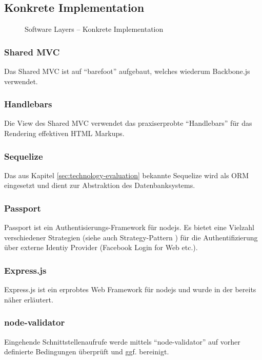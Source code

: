 \subsection*{Konkrete Implementation}

\begin{figure}[H]
	\centering{
		
	}

	\caption{Software Layers -- Konkrete Implementation}
\end{figure}

\subsubsection*{Shared MVC}
Das Shared MVC ist auf ``barefoot'' \cite{Barefoot} aufgebaut, welches wiederum Backbone.js \cite{Backbonejs} verwendet.

\subsubsection*{Handlebars}
Die View des Shared MVC verwendet das praxiserprobte ``Handlebars'' \cite{Handlebars} für das Rendering effektiven HTML Markups.

\subsubsection*{Sequelize}
Das aus Kapitel \ref{sec:technology-evaluation}  bekannte Sequelize \cite{Sequelize} wird als ORM eingesetzt und dient zur Abstraktion des Datenbanksystems.

\subsubsection*{Passport}
Passport \cite{Passportjs} ist ein Authentisierungs-Framework für \gls{nodejs}. Es bietet eine Vielzahl verschiedener Strategien (siehe auch Strategy-Pattern \cite{StrategyPattern}) für die Authentifizierung über externe Identiy Provider (Facebook Login for Web \cite{facebooklogin} etc.).

\subsubsection*{Express.js}
Express.js \cite{Expressjs} ist ein erprobtes Web Framework für \gls{nodejs} und wurde in der  bereits näher erläutert.

\subsubsection*{node-validator}
Eingehende Schnittstellenaufrufe werde mittels ``node-validator'' \cite{nodevalidator} auf vorher definierte Bedingungen überprüft und ggf. bereinigt.

